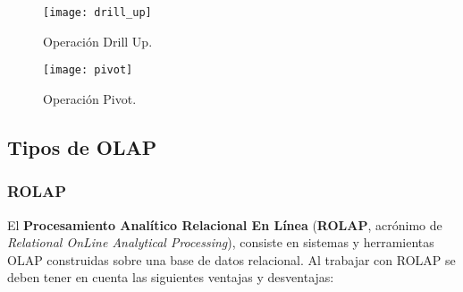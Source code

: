 \documentclass[a4paper,11pt]{article}
\begin{document}
    \begin{figure}
      \begin{center}
        \texttt{[image: drill\_up]}
        \caption{Operación Drill Up. \cite{operaciones}}
        \label{drill_up}
      \end{center}
    \end{figure}
    
    \begin{figure}
      \begin{center}
        \texttt{[image: pivot]}
        \caption{Operación Pivot. \cite{operaciones}}
        \label{pivot}
      \end{center}
    \end{figure}
    
    
    \subsection{Tipos de OLAP}
    
    \subsubsection{ROLAP}
    
    El \textbf{Procesamiento Analítico Relacional En Línea} (\textbf{ROLAP}, acrónimo de \textit{Relational OnLine Analytical Processing}), consiste en sistemas
    y herramientas OLAP construidas sobre una base de datos relacional. Al trabajar con ROLAP se deben tener en cuenta las siguientes ventajas y desventajas:
    
\end{document}
